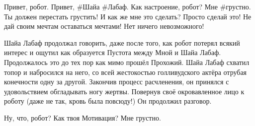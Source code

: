 {\small \begin{dialog}
\X Привет, робот.
\R Привет, \#Шайа \#Лабаф.
\X Как настроение, робот?
\R Мне \#грустно.
\X Ты должен перестать грустить!
\R И как же мне это сделать?
\X Просто сделай это! Не дай своим мечтам оставаться мечтами! Нет ничего невозможного!
\end{dialog}

\begin{monolog}
Шайа Лабаф продолжал говорить, даже после того, как робот потерял всякий интерес и ощутил как образуется Пустота между Мной и Шайа Лабаф. Продолжалось это до тех пор как мимо прошёл Прохожий. Шайа Лабаф схватил топор и набросился на него, со всей жестокостью голливудского актёра отрубая конечности одну за другой. Закончив процесс расчленения, он принялся с удовольствием обгладывать ногу жертвы. Повернув своё окровавленное лицо к роботу (даже не так, кровь была повсюду!) Он продолжил разговор.
\end{monolog}

\begin{dialog}
\X Ну, что, робот? Как твоя Мотивация?
\R Мне грустно.
\end{dialog}}